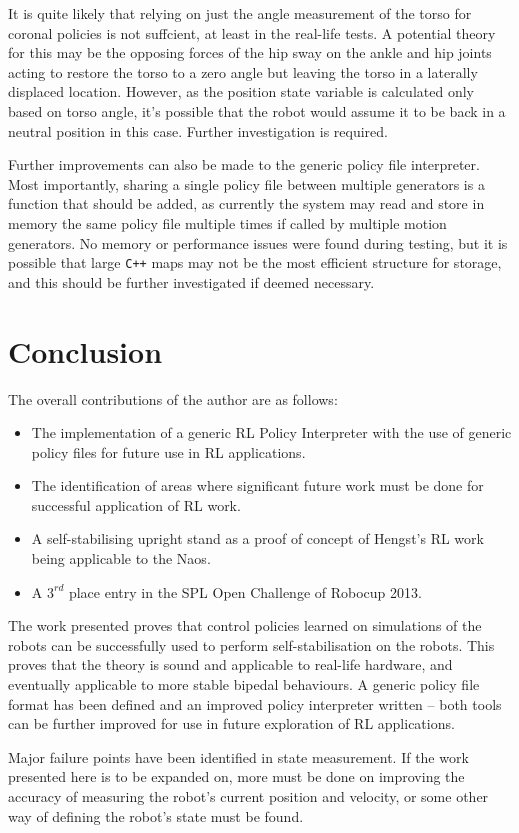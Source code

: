 It is quite likely that relying on just the angle measurement of the torso for coronal policies is not suffcient, at least in the real-life tests. A potential theory for this may be the opposing forces of the hip sway on the ankle and hip joints acting to restore the torso to a zero angle but leaving the torso in a laterally displaced location. However, as the position state variable is calculated only based on torso angle, it's possible that the robot would assume it to be back in a neutral position in this case. Further investigation is required.

Further improvements can also be made to the generic policy file interpreter. Most importantly, sharing a single policy file between multiple generators is a function that should be added, as currently the system may read and store in memory the same policy file multiple times if called by multiple motion generators. No memory or performance issues were found during testing, but it is possible that large \verb!C++! maps may not be the most efficient structure for storage, and this should be further investigated if deemed necessary.

\section{Conclusion}
The overall contributions of the author are as follows:
\begin{itemize}
\item The implementation of a generic RL Policy Interpreter with the use of generic policy files for future use in RL applications.
\item The identification of areas where significant future work must be done for successful application of RL work.
\item A self-stabilising upright stand as a proof of concept of Hengst's RL work being applicable to the Naos.
\item A $3^{rd}$ place entry in the SPL Open Challenge of Robocup 2013.
\end{itemize}

The work presented proves that control policies learned on simulations of the robots can be successfully used to perform self-stabilisation on the robots. This proves that the theory is sound and applicable to real-life hardware, and eventually applicable to more stable bipedal behaviours. A generic policy file format has been defined and an improved policy interpreter written -- both tools can be further improved for use in future exploration of RL applications.

Major failure points have been identified in state measurement. If the work presented here is to be expanded on, more must be done on improving the accuracy of measuring the robot's current position and velocity, or some other way of defining the robot's state must be found.
